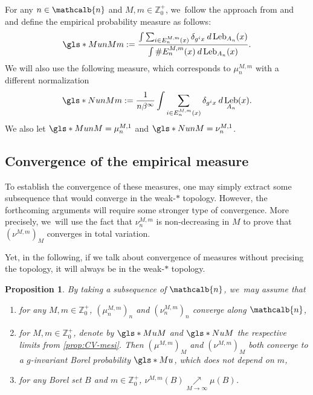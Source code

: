 \documentclass[10pt]{amsart}
\newenvironment{enumeratei}
{\bgroup\def\theenumi{\roman{enumi}}\def\theenumii{\arabic{enumii}}\begin{enumerate}}
{\end{enumerate}\egroup}
\DeclareMathOperator{\Leb}{Leb}
\newcommand{\mcbn}{{\mathcalb{n}}}
\newtheorem{prop}[thm]{Proposition}
\theoremstyle{definition}
\newcommand{\bbZ}{{\mathbb{Z}}}
\begin{document}
For any $n \in \mcbn$ and $M,m \in \bbZ_0^+$, we~follow the approach from \cite{BCS_cont} and \cite{burguet2024srbPH} and define the empirical probability measure as follows:
\[
\gls*{MunMm} := \frac{\int \sum_{i \in E_n^{M,m}(x)} \delta_{g^i x} \: d \Leb_{A_n}(x)}{\int \# E_n^{M,m}(x) \: d \Leb_{A_n}(x)}.
\]
We will also use the following measure, which corresponds to $\mu_n^{M,m}$ with a different normalization
\[
\gls*{NunMm} := \frac{1}{n \beta^{\infty}} \int \sum_{i \in E_n^{M,m}(x)} \delta_{g^i x} \: d \Leb_{A_n}(x).
\]
We also let $\gls*{MunM} = \mu_n^{M,1}$ and $\gls*{NunM} = \nu_n^{M,1}$.

\subsection{Convergence of the empirical measure}

To establish the convergence of these measures, one may simply extract some subsequence that would converge in the weak\nobreakdash-$*$ topology.
However, the forthcoming arguments will require some stronger type of convergence.
More precisely, we~will use the fact that $\nu_n^{M,m}$ is non-decreasing in $M$ to prove that $\left (\nu^{M,m} \right)_M$ converges in total variation.

Yet, in the following, if we talk about convergence of measures without precising the topology, it will always be in the weak\nobreakdash-$*$ topology.

\begin{prop}
\label{prop:CV-mes}
By taking a subsequence of $\mcbn$, we~may assume that
\begin{enumeratei}
\item\label{prop:CV-mesi}
 for any $M,m \in \bbZ_0^+$, $(\mu_n^{M,m})_n$ and $(\nu_n^{M,m})_n$ converge along $\mcbn$,
\item\label{prop:CV-mesii}
 for $M,m \in \bbZ_0^+$, denote by
$\gls*{MuM}$ and
$\gls*{NuM}$ the respective limits from \eqref{prop:CV-mesi}. Then $(\mu^{M,m})_M$ and $(\nu^{M,m})_M$ both converge to a $g$-invariant Borel probability
$\gls*{Mu}$, which does not depend on $m$,
\item\label{prop:CV-mesiii}
 for any Borel set $B$ and $m \in \bbZ_0^+$, $\nu^{M,m}(B) \underset{M \to \infty}{\nearrow} \mu(B)$.
\end{enumeratei}
\end{prop}
\end{document}
